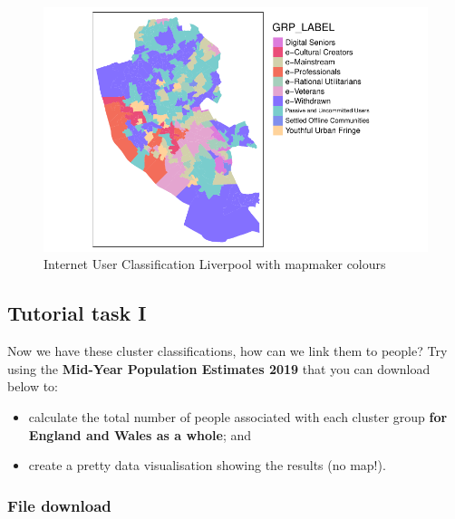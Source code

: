 \documentclass[
  letterpaper,
  DIV=11,
  numbers=noendperiod]{scrreprt}
\providecommand{\tightlist}{%
  \setlength{\itemsep}{0pt}\setlength{\parskip}{0pt}}\usepackage{longtable,booktabs,array}
\begin{document}
\begin{figure}[H]

{\centering \includegraphics{01-geodemographics_files/figure-pdf/fig-geo-pretty-colours-1.pdf}

}

\caption{\label{fig-geo-pretty-colours}Internet User Classification
Liverpool with mapmaker colours}

\end{figure}

\hypertarget{task-geo-1}{%
\subsection{Tutorial task I}\label{task-geo-1}}

Now we have these cluster classifications, how can we link them to
people? Try using the \textbf{Mid-Year Population Estimates 2019} that
you can download below to:

\begin{itemize}
\tightlist
\item
  calculate the total number of people associated with each cluster
  group \textbf{for England and Wales as a whole}; and
\item
  create a pretty data visualisation showing the results (no map!).
\end{itemize}

\hypertarget{file-download}{%
\subsubsection*{File download}\label{file-download}}
\end{document}
